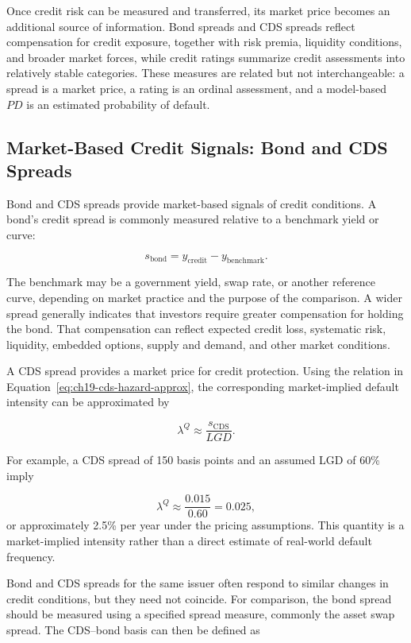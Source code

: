 Once credit risk can be measured and transferred, its market price becomes an additional source of information. Bond spreads and CDS spreads reflect compensation for credit exposure, together with risk premia, liquidity conditions, and broader market forces, while credit ratings summarize credit assessments into relatively stable categories. These measures are related but not interchangeable: a spread is a market price, a rating is an ordinal assessment, and a model-based \(PD\) is an estimated probability of default.

\subsection[Market-Based Credit Signals: Bond and CDS Spreads]{Market-Based Credit Signals: Bond and CDS Spreads}

Bond and CDS spreads provide market-based signals of credit conditions. A bond's credit spread is commonly measured relative to a benchmark yield or curve:

\begin{equation}
s_{\mathrm{bond}}
=y_{\mathrm{credit}}-
y_{\mathrm{benchmark}}.
\label{eq:ch19-bond-spread}
\end{equation}

The benchmark may be a government yield, swap rate, or another reference curve, depending on market practice and the purpose of the comparison. A wider spread generally indicates that investors require greater compensation for holding the bond. That compensation can reflect expected credit loss, systematic risk, liquidity, embedded options, supply and demand, and other market conditions.

A CDS spread provides a market price for credit protection. Using the relation in Equation~\eqref{eq:ch19-cds-hazard-approx}, the corresponding market-implied default intensity can be approximated by

$$
\lambda^{Q}
\approx
\frac{s_{\mathrm{CDS}}}{LGD}.
$$

For example, a CDS spread of 150 basis points and an assumed LGD of 60\% imply

$$
\lambda^{Q}
\approx
\frac{0.015}{0.60}
=
0.025,
$$
or approximately 2.5\% per year under the pricing assumptions. This quantity is a market-implied intensity rather than a direct estimate of real-world default frequency.

Bond and CDS spreads for the same issuer often respond to similar changes in credit conditions, but they need not coincide. For comparison, the bond spread should be measured using a specified spread measure, commonly the asset swap spread. The CDS--bond basis can then be defined as

